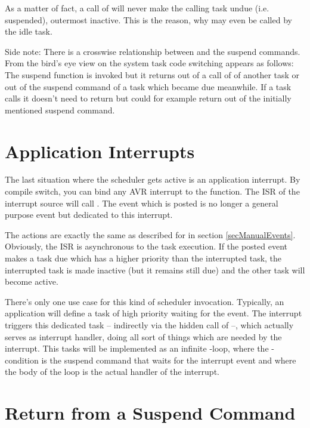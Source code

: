 As a matter of fact, a call of  will never make the
calling task undue (i.e. suspended), outermost inactive. This is the
reason, why  may even be called by the idle task.

Side note: There is a crosswise relationship between
 and the suspend commands. From the bird's eye view
on the system task code switching appears as follows: The suspend function
is invoked but it returns out of a call of  of
another task or out of the suspend command of a task which became due
meanwhile. If a task calls  it doesn't need to
return but could for example return out of the initially mentioned suspend
command.


\section{Application Interrupts}
\label{secInterruptEvents}

The last situation where the scheduler gets active is an application
interrupt. By compile switch, you can bind any AVR interrupt to the
 function. The ISR of the interrupt source will call
. The event which is posted is no longer a general purpose
event but dedicated to this interrupt.

The actions are exactly the same as described for  in
section \ref{secManualEvents}. Obviously, the ISR is asynchronous to the
task execution. If the posted event makes a task due which has a higher
priority than the interrupted task, the interrupted task is made inactive
(but it remains still due) and the other task will become active.

There's only one use case for this kind of scheduler invocation.
Typically, an application will define a task of high priority waiting for
the event. The interrupt triggers this dedicated task -- indirectly via
the hidden call of  --, which actually serves as
interrupt handler, doing all sort of things which are needed by the
interrupt. This tasks will be implemented as an infinite
-loop, where the -condition is the suspend
command that waits for the interrupt event and where the body of the loop
is the actual handler of the interrupt.


\section{Return from a Suspend Command}
\label{secReturnFromSuspend}

